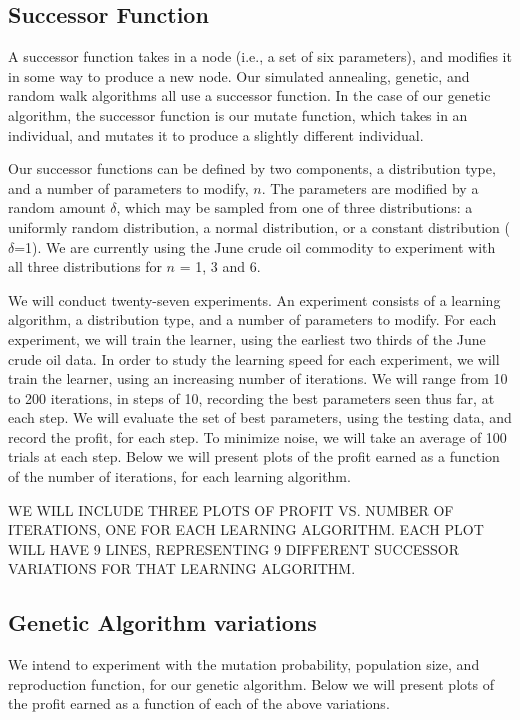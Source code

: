 \documentclass[12pt]{article}
\begin{document}
\subsection{Successor Function}

A successor function takes in a node (i.e., a set of six parameters), and
modifies it in some way to produce a new node.  Our simulated annealing,
genetic, and random walk algorithms all use a successor function.  In the case
of our genetic algorithm, the successor function is our mutate function, which
takes in an individual, and mutates it to produce a slightly different
individual.

Our successor functions can be defined by two components, a distribution type,
and a number of parameters to modify, $n$. The parameters are modified by a
random amount $\delta$, which may be sampled from one of three distributions: a
uniformly random distribution, a normal distribution, or a constant distribution
($\delta$=1). We are currently using the June crude oil commodity to experiment
with all three distributions for $n$ = 1, 3 and 6.


We will conduct twenty-seven experiments. An experiment consists of a learning
algorithm, a distribution type, and a number of parameters to modify. For each
experiment, we will train the learner, using the earliest two thirds of the June
crude oil data. In order to study the learning speed for each experiment, we
will train the learner, using an increasing number of iterations. We will range
from 10 to 200 iterations, in steps of 10, recording the best parameters seen
thus far, at each step. We will evaluate the set of best parameters, using the
testing data, and record the profit, for each step. To minimize noise, we will
take an average of 100 trials at each step. Below we will present plots of the
profit earned as a function of the number of iterations, for each learning
algorithm.


WE WILL INCLUDE THREE PLOTS OF PROFIT VS. NUMBER OF ITERATIONS, ONE FOR EACH
LEARNING ALGORITHM. EACH PLOT WILL HAVE 9 LINES, REPRESENTING 9 DIFFERENT
SUCCESSOR VARIATIONS FOR THAT LEARNING ALGORITHM.


\subsection{Genetic Algorithm variations}

We intend to experiment with the mutation probability, population size, and
reproduction function, for our genetic algorithm. Below we will present plots of
the profit earned as a function of each of the above variations.
\end{document}
